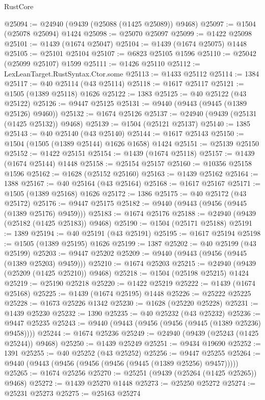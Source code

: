 \begin{lexlean}{RustCore}
\begin{coremodule}
@25094 := @24940 (@9439 (@25088 (@1425 @25089)) @9468)
@25097 := @1504 (@25078 @25094) @1424
@25098 := @25070 @25097
@25099 := @1422 @25098
@25101 := @1439 (@1674 @25047)
@25104 := @1439 (@1674 @25075) @1448
@25105 := @25101 @25104
@25107 := @6823 @25105 @1596
@25110 := @25042 (@25099 @25107) @1599
@25111 := @1426 @25110
@25112 := LexLeanTarget.RustSyntax.Ctor.some
@25113 := @1433 @25112
@25114 := 1384
@25117 := @40 @25114 (@43 @25114)
@25118 := @1617 @25117
@25121 := @1505 (@1389 @25118) @1626
@25122 := 1383
@25125 := @40 @25122 (@43 @25122)
@25126 := @9447 @25125
@25131 := @9440 (@9443 (@9445 (@1389 @25126) @9460))
@25132 := @1674 @25126
@25137 := @24940 (@9439 (@25131 (@1425 @25132)) @9468)
@25139 := @1504 (@25121 @25137)
@25140 := 1385
@25143 := @40 @25140 (@43 @25140)
@25144 := @1617 @25143
@25150 := @1504 (@1505 (@1389 @25144) @1626 @1658) @1424
@25151 := @25139 @25150
@25152 := @1422 @25151
@25154 := @1439 (@1674 @25118)
@25157 := @1439 (@1674 @25144) @1448
@25158 := @25154 @25157
@25160 := @10356 @25158 @1596
@25162 := @1628 (@25152 @25160)
@25163 := @1439 @25162
@25164 := 1388
@25167 := @40 @25164 (@43 @25164)
@25168 := @1617 @25167
@25171 := @1505 (@1389 @25168) @1626
@25172 := 1386
@25175 := @40 @25172 (@43 @25172)
@25176 := @9447 @25175
@25182 := @9440 (@9443 (@9456 (@9445 (@1389 @25176) @9459)))
@25183 := @1674 @25176
@25188 := @24940 (@9439 (@25182 (@1425 @25183)) @9468)
@25190 := @1504 (@25171 @25188)
@25191 := 1389
@25194 := @40 @25191 (@43 @25191)
@25195 := @1617 @25194
@25198 := @1505 (@1389 @25195) @1626
@25199 := 1387
@25202 := @40 @25199 (@43 @25199)
@25203 := @9447 @25202
@25209 := @9440 (@9443 (@9456 (@9445 (@1389 @25203) @9459)))
@25210 := @1674 @25203
@25215 := @24940 (@9439 (@25209 (@1425 @25210)) @9468)
@25218 := @1504 (@25198 @25215) @1424
@25219 := @25190 @25218
@25220 := @1422 @25219
@25222 := @1439 (@1674 @25168)
@25225 := @1439 (@1674 @25195) @1448
@25226 := @25222 @25225
@25228 := @1673 @25226 @1342
@25230 := @1628 (@25220 @25228)
@25231 := @1439 @25230
@25232 := 1390
@25235 := @40 @25232 (@43 @25232)
@25236 := @9447 @25235
@25243 := @9440 (@9443 (@9456 (@9456 (@9445 (@1389 @25236) @9458))))
@25244 := @1674 @25236
@25249 := @24940 (@9439 (@25243 (@1425 @25244)) @9468)
@25250 := @1439 @25249
@25251 := @9434 @19690
@25252 := 1391
@25255 := @40 @25252 (@43 @25252)
@25256 := @9447 @25255
@25264 := @9440 (@9443 (@9456 (@9456 (@9456 (@9445 (@1389 @25256) @9457)))))
@25265 := @1674 @25256
@25270 := @25251 (@9439 (@25264 (@1425 @25265)) @9468)
@25272 := @1439 @25270 @1448
@25273 := @25250 @25272
@25274 := @25231 @25273
@25275 := @25163 @25274

\end{coremodule}
\end{lexlean}
